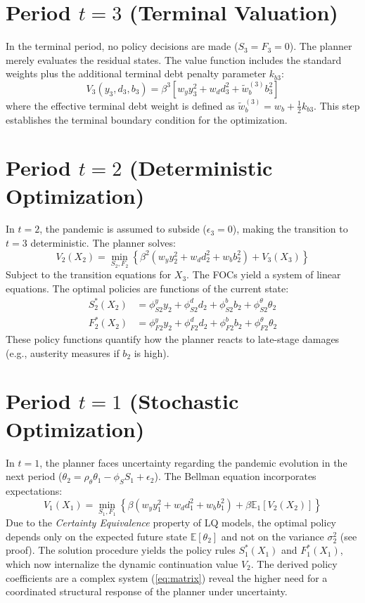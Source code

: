 \section*{Period $t=3$ (Terminal Valuation)}
In the terminal period, no policy decisions are made ($S_3 = F_3 = 0$). The planner merely evaluates the residual states. The value function includes the standard weights plus the additional terminal debt penalty parameter $k_{b3}$:
\begin{equation}
    V_3(y_3, d_3, b_3) = \beta^3 \left[ w_y y_3^2 + w_d d_3^2 + \tilde{w}_b^{(3)} b_3^2 \right]
\end{equation}
where the effective terminal debt weight is defined as $\tilde{w}_b^{(3)} = w_b + \frac{1}{2}k_{b3}$. This step establishes the terminal boundary condition for the optimization.

\section*{Period $t=2$ (Deterministic Optimization)}
In $t=2$, the pandemic is assumed to subside ($\epsilon_3 = 0$), making the transition to $t=3$ deterministic. The planner solves:
\begin{equation}
    V_2(X_2) = \min_{S_2, F_2} \left\{ \beta^2 \left( w_y y_2^2 + w_d d_2^2 + w_b b_2^2 \right) + V_3(X_3) \right\}
\end{equation}
Subject to the transition equations for $X_3$. The FOCs yield a system of linear equations. The optimal policies are functions of the current state:
\begin{align}
    S_2^*(X_2) &= \phi_{S2}^y y_2 + \phi_{S2}^d d_2 + \phi_{S2}^b b_2 + \phi_{S2}^\theta \theta_2 \\
    F_2^*(X_2) &= \phi_{F2}^y y_2 + \phi_{F2}^d d_2 + \phi_{F2}^b b_2 + \phi_{F2}^\theta \theta_2
\end{align}
These policy functions quantify how the planner reacts to late-stage damages (e.g., austerity measures if $b_2$ is high).

\section*{Period $t=1$ (Stochastic Optimization)}
In $t=1$, the planner faces uncertainty regarding the pandemic evolution in the next period ($\theta_2 = \rho_\theta \theta_1 - \phi_S S_1 + \epsilon_2$). The Bellman equation incorporates expectations:
\begin{equation}
    V_1(X_1) = \min_{S_1, F_1} \left\{ \beta \left( w_y y_1^2 + w_d d_1^2 + w_b b_1^2 \right) + \beta \mathbb{E}_1 \left[ V_2(X_2) \right] \right\}
\end{equation}
Due to the \textit{Certainty Equivalence} property of LQ models, the optimal policy depends only on the expected future state $\mathbb{E}[\theta_2]$ and not on the variance $\sigma_2^2$ (see proof). The solution procedure yields the policy rules $S_1^*(X_1)$ and $F_1^*(X_1)$, which now internalize the dynamic continuation value $V_2$. The derived policy coefficients are a complex system (\ref{eq:matrix}) reveal the higher need for a coordinated structural response of the planner under uncertainty.

